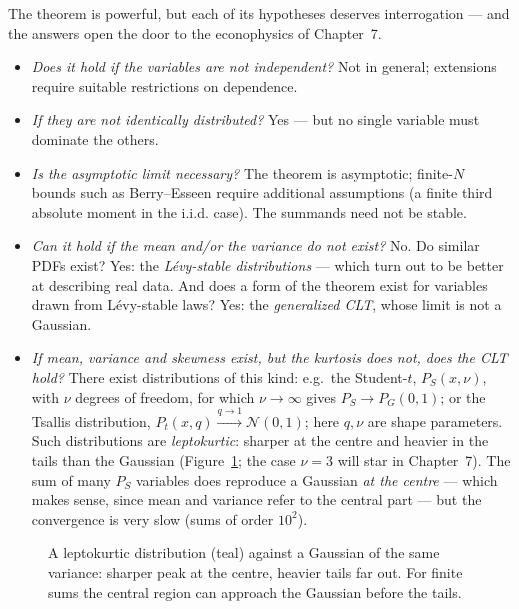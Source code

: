 The theorem is powerful, but each of its hypotheses deserves interrogation --- and the answers open the door to the econophysics of Chapter~7.
\begin{itemize}
    \item \emph{Does it hold if the variables are not independent?} Not in general; extensions require suitable restrictions on dependence.
    \item \emph{If they are not identically distributed?} Yes --- but no single variable must dominate the others.
    \item \emph{Is the asymptotic limit necessary?} The theorem is asymptotic; finite-$N$ bounds such as Berry--Esseen require additional assumptions (a finite third absolute moment in the i.i.d. case).
    The summands need not be stable.
    \item \emph{Can it hold if the mean and/or the variance do not exist?} No.
    Do similar PDFs exist? Yes: the \emph{L\'evy-stable distributions} --- which turn out to be better at describing real data.
    And does a form of the theorem exist for variables drawn from L\'evy-stable laws? Yes: the \emph{generalized CLT}, whose limit is not a Gaussian.
    \item \emph{If mean, variance and skewness exist, but the kurtosis does not, does the CLT hold?}
    There exist distributions of this kind: e.g.\ the Student-$t$, $P_S(x,\nu)$, with $\nu$ degrees of freedom, for which $\nu\to\infty$ gives $P_S\to P_G(0,1)$; or the Tsallis distribution, $P_t(x,q)\xrightarrow{q\to1}\mathcal{N}(0,1)$; here $q,\nu$ are shape parameters.
    Such distributions are \emph{leptokurtic}: sharper at the centre and heavier in the tails than the Gaussian (Figure~\ref{fig:leptokurtic}; the case $\nu=3$ will star in Chapter~7).
    The sum of many $P_S$ variables does reproduce a Gaussian \emph{at the centre} --- which makes sense, since mean and variance refer to the central part --- but the convergence is very slow (sums of order $10^2$).
\end{itemize}

\begin{figure}[h!]
\centering
{}
\caption{A leptokurtic distribution (teal) against a Gaussian of the same variance: sharper peak at the centre, heavier tails far out. For finite sums the central region can approach the Gaussian before the tails.}
\label{fig:leptokurtic}
\end{figure}

